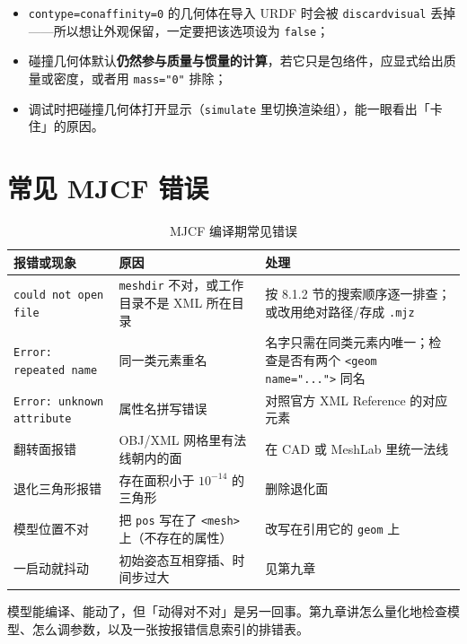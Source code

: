\begin{itemize}
	\item \texttt{contype=conaffinity=0} 的几何体在导入 URDF 时会被 \texttt{discardvisual} 丢掉——所以想让外观保留，一定要把该选项设为 \texttt{false}；
	\item 碰撞几何体默认\textbf{仍然参与质量与惯量的计算}，若它只是包络件，应显式给出质量或密度，或者用 \texttt{mass="0"} 排除；
	\item 调试时把碰撞几何体打开显示（\texttt{simulate} 里切换渲染组），能一眼看出「卡住」的原因。
\end{itemize}

\section{常见 MJCF 错误}

\begin{table}[H]
	\centering
	\caption{MJCF 编译期常见错误}
	\label{tab:Mjcf:报错}
	\footnotesize
	\begin{tabular}{>{\raggedright\arraybackslash}p{5.0cm}>{\raggedright\arraybackslash}p{4.4cm}>{\raggedright\arraybackslash}p{4.8cm}}
		\hline
		报错或现象 & 原因 & 处理 \\
		\hline
		\texttt{could not open file} & \texttt{meshdir} 不对，或工作目录不是 XML 所在目录 & 按 8.1.2 节的搜索顺序逐一排查；或改用绝对路径/存成 \texttt{.mjz} \\
		\texttt{Error: repeated name} & 同一类元素重名 & 名字只需在同类元素内唯一；检查是否有两个 \texttt{<geom name="...">} 同名 \\
		\texttt{Error: unknown attribute} & 属性名拼写错误 & 对照官方 XML Reference 的对应元素 \\
		翻转面报错 & OBJ/XML 网格里有法线朝内的面 & 在 CAD 或 MeshLab 里统一法线 \\
		退化三角形报错 & 存在面积小于 $10^{-14}$ 的三角形 & 删除退化面 \\
		模型位置不对 & 把 \texttt{pos} 写在了 \texttt{<mesh>} 上（不存在的属性） & 改写在引用它的 \texttt{geom} 上 \\
		一启动就抖动 & 初始姿态互相穿插、时间步过大 & 见第九章 \\
		\hline
	\end{tabular}
\end{table}

\begin{tipbox}[下一步]
	模型能编译、能动了，但「动得对不对」是另一回事。第九章讲怎么量化地检查模型、怎么调参数，以及一张按报错信息索引的排错表。
\end{tipbox}
